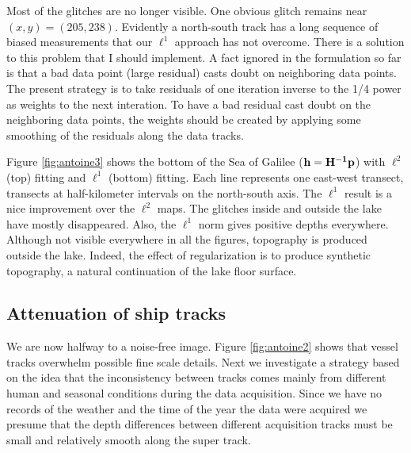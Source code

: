 \par
Most of the glitches are no longer visible.
One obvious glitch remains near $(x,y)=(205,238)$.
Evidently a north-south track has a long sequence of biased measurements
that our $\ell^1$ approach has not overcome.
There is a solution to this problem that I should implement.
A fact ignored in the formulation so far is that a bad data point
(large residual) casts doubt on neighboring data points.
The present strategy is to take residuals of one iteration
inverse to the 1/4 power as weights to the next interation.
To have a bad residual cast doubt on the neighboring data points,
the weights should be created by applying some
smoothing of the residuals along the data tracks.



\par
Figure \ref{fig:antoine3}
shows the bottom of the Sea of Galilee (${\bf h = {\bf H^{-1}p}}$)
with $\ell^2$ (top) fitting and  $\ell^1$ (bottom) fitting. 
Each line represents one east-west transect,
transects at half-kilometer intervals on the north-south axis.
The $\ell^1$ result is a nice improvement over the $\ell^2$ maps.
The glitches inside and outside the lake have mostly disappeared.
Also, the $\ell^1$ norm gives positive depths everywhere. 
Although not visible everywhere in all the figures,
topography is produced outside the lake.
Indeed, the effect of regularization is to produce synthetic topography,
a natural continuation of the lake floor surface.

\subsection{Attenuation of ship tracks}

\par
We are now halfway to a noise-free image.
Figure \ref{fig:antoine2} shows that
vessel tracks overwhelm possible fine scale details.
Next we investigate a strategy based on the idea that
the inconsistency between tracks comes mainly 
from different human and seasonal conditions during the data acquisition. 
Since we have no records of the weather and the time 
of the year the data were acquired
we presume that the depth differences between different acquisition tracks
must be small and relatively smooth along the super track.



